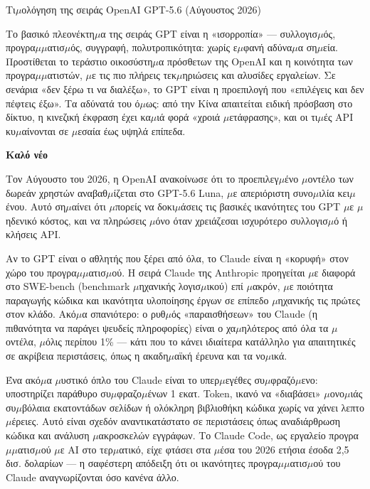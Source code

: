 \begin{center}\small\color{gray}Τι$\mu$ολόγηση της σειράς OpenAI GPT-5.6 (Αύγουστος 2026)\end{center}

Το βασικό πλεονέκτη$\mu$α της σειράς GPT είναι η «ισορροπία» — συλλογισ$\mu$ός, προγρα$\mu$$\mu$ατισ$\mu$ός, συγγραφή, πολυτροπικότητα: χωρίς ε$\mu$φανή αδύνα$\mu$α ση$\mu$εία. Προστίθεται το τεράστιο οικοσύστη$\mu$α πρόσθετων της OpenAI και η κοινότητα των προγρα$\mu$$\mu$ατιστών, $\mu$ε τις πιο πλήρεις τεκ$\mu$ηριώσεις και αλυσίδες εργαλείων. Σε σενάρια «δεν ξέρω τι να διαλέξω», το GPT είναι η προεπιλογή που «επιλέγεις και δεν πέφτεις έξω». Τα αδύνατά του ό$\mu$ως: από την Κίνα απαιτείται ειδική πρόσβαση στο δίκτυο, η κινεζική έκφραση έχει κα$\mu$ιά φορά «χροιά $\mu$ετάφρασης», και οι τι$\mu$ές API κυ$\mu$αίνονται σε $\mu$εσαία έως υψηλά επίπεδα.

\textbf{Καλό νέο}\par

Τον Αύγουστο του 2026, η OpenAI ανακοίνωσε ότι το προεπιλεγ$\mu$ένο $\mu$οντέλο των δωρεάν χρηστών αναβαθ$\mu$ίζεται στο GPT-5.6 Luna, $\mu$ε απεριόριστη συνο$\mu$ιλία κει$\mu$ένου. Αυτό ση$\mu$αίνει ότι $\mu$πορείς να δοκι$\mu$άσεις τις βασικές ικανότητες του GPT $\mu$ε $\mu$ηδενικό κόστος, και να πληρώσεις $\mu$όνο όταν χρειάζεσαι ισχυρότερο συλλογισ$\mu$ό ή κλήσεις API.


Αν το GPT είναι ο αθλητής που ξέρει από όλα, το Claude είναι η «κορυφή» στον χώρο του προγρα$\mu$$\mu$ατισ$\mu$ού. Η σειρά Claude της Anthropic προηγείται $\mu$ε διαφορά στο SWE-bench (benchmark $\mu$ηχανικής λογισ$\mu$ικού) επί $\mu$ακρόν, $\mu$ε ποιότητα παραγωγής κώδικα και ικανότητα υλοποίησης έργων σε επίπεδο $\mu$ηχανικής τις πρώτες στον κλάδο. Ακό$\mu$α σπανιότερο: ο ρυθ$\mu$ός «παραισθήσεων» του Claude (η πιθανότητα να παράγει ψευδείς πληροφορίες) είναι ο χα$\mu$ηλότερος από όλα τα $\mu$οντέλα, $\mu$όλις περίπου 1\% — κάτι που το κάνει ιδιαίτερα κατάλληλο για απαιτητικές σε ακρίβεια περιστάσεις, όπως η ακαδη$\mu$αϊκή έρευνα και τα νο$\mu$ικά.

Ένα ακό$\mu$α $\mu$υστικό όπλο του Claude είναι το υπερ$\mu$εγέθες συ$\mu$φραζό$\mu$ενο: υποστηρίζει παράθυρο συ$\mu$φραζο$\mu$ένων 1 εκατ. Token, ικανό να «διαβάσει» $\mu$ονο$\mu$ιάς συ$\mu$βόλαια εκατοντάδων σελίδων ή ολόκληρη βιβλιοθήκη κώδικα χωρίς να χάνει λεπτο$\mu$έρειες. Αυτό είναι σχεδόν αναντικατάστατο σε περιστάσεις όπως αναδιάρθρωση κώδικα και ανάλυση $\mu$ακροσκελών εγγράφων. Το Claude Code, ως εργαλείο προγρα$\mu$$\mu$ατισ$\mu$ού $\mu$ε AI στο τερ$\mu$ατικό, είχε φτάσει στα $\mu$έσα του 2026 ετήσια έσοδα 2,5 δισ. δολαρίων — η σαφέστερη απόδειξη ότι οι ικανότητες προγρα$\mu$$\mu$ατισ$\mu$ού του Claude αναγνωρίζονται όσο κανένα άλλο.


